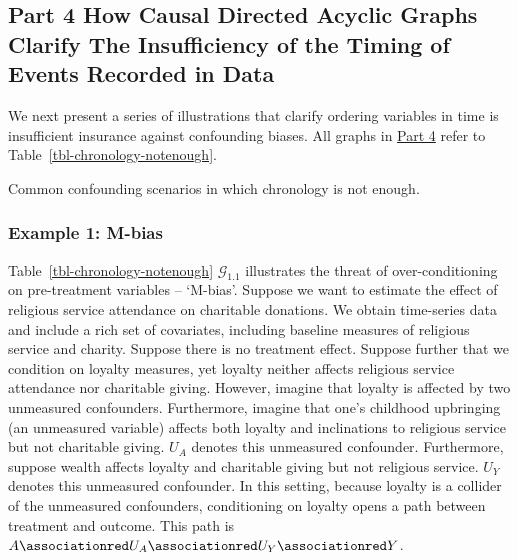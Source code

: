 \documentclass[
  single column]{article}
\begin{document}
\subsection{Part 4 How Causal Directed Acyclic Graphs Clarify The
Insufficiency of the Timing of Events Recorded in Data}\label{id-sec-4}

We next present a series of illustrations that clarify ordering
variables in time is insufficient insurance against confounding biases.
All graphs in \hyperref[id-sec-4]{Part 4} refer to
Table~\ref{tbl-chronology-notenough}.

\begin{table}

\caption{\label{tbl-chronology-notenough}Common confounding scenarios in
which chronology is not enough.}

\centering{

\terminologychronologicalhygeineNOTENOUGH

}

\end{table}%

\subsubsection{Example 1: M-bias}\label{example-1-m-bias}

Table~\ref{tbl-chronology-notenough} \(\mathcal{G}_{1.1}\) illustrates
the threat of over-conditioning on pre-treatment variables -- `M-bias'.
Suppose we want to estimate the effect of religious service attendance
on charitable donations. We obtain time-series data and include a rich
set of covariates, including baseline measures of religious service and
charity. Suppose there is no treatment effect. Suppose further that we
condition on loyalty measures, yet loyalty neither affects religious
service attendance nor charitable giving. However, imagine that loyalty
is affected by two unmeasured confounders. Furthermore, imagine that
one's childhood upbringing (an unmeasured variable) affects both loyalty
and inclinations to religious service but not charitable giving. \(U_A\)
denotes this unmeasured confounder. Furthermore, suppose wealth affects
loyalty and charitable giving but not religious service. \(U_Y\) denotes
this unmeasured confounder. In this setting, because loyalty is a
collider of the unmeasured confounders, conditioning on loyalty opens a
path between treatment and outcome. This path is
\(A \associationred U_A \associationred U_Y \associationred Y\).
\end{document}

